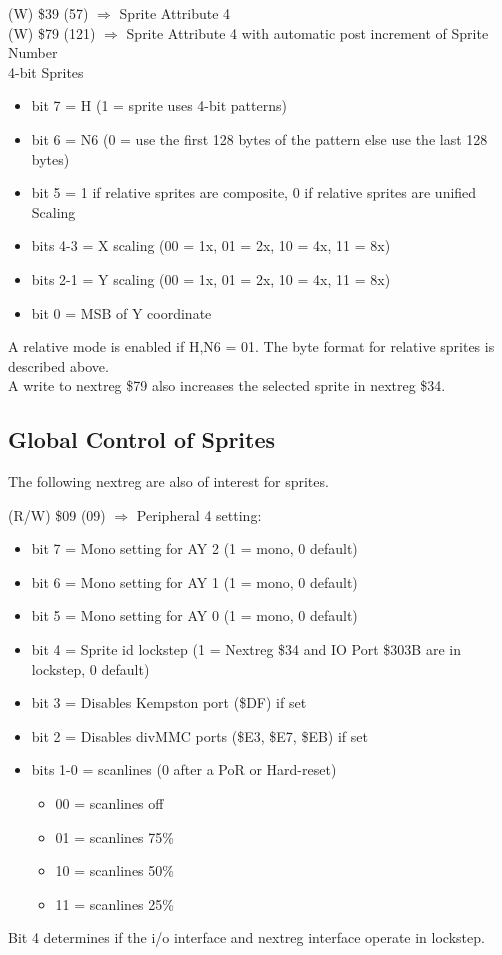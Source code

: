 (W) \$39 (57) $\Rightarrow$ Sprite Attribute 4\\
(W) \$79 (121) $\Rightarrow$ Sprite Attribute 4 with automatic post
increment of Sprite Number\\
4-bit Sprites
\begin{itemize}
\item[] bit 7 = H (1 = sprite uses 4-bit patterns)
\item[] bit 6 = N6 (0 = use the first 128 bytes of the pattern else
  use the last 128 bytes)
\item[] bit 5 = 1 if relative sprites are composite, 0 if relative
  sprites are unified Scaling
\item[] bits 4-3 = X scaling (00 = 1x, 01 = 2x, 10 = 4x, 11 = 8x)
\item[] bits 2-1 = Y scaling (00 = 1x, 01 = 2x, 10 = 4x, 11 = 8x)
\item[] bit 0 = MSB of Y coordinate
\end{itemize}
A relative mode is enabled if H,N6 = 01. The byte format for relative
sprites is described above.\\
A write to nextreg \$79 also increases the selected sprite in nextreg
\$34.

\subsection{Global Control of Sprites}

The following nextreg are also of interest for sprites.

(R/W) \$09 (09) $\Rightarrow$ Peripheral 4 setting:
\begin{itemize}
\item[] bit 7 = Mono setting for AY 2 (1 = mono, 0 default)
\item[] bit 6 = Mono setting for AY 1 (1 = mono, 0 default)
\item[] bit 5 = Mono setting for AY 0 (1 = mono, 0 default)
\item[] bit 4 = Sprite id lockstep (1 = Nextreg \$34 and IO Port
  \$303B are in lockstep, 0 default)
\item[] bit 3 = Disables Kempston port (\$DF) if set
\item[] bit 2 = Disables divMMC ports (\$E3, \$E7, \$EB) if set
\item[] bits 1-0 = scanlines (0 after a PoR or Hard-reset)
  \begin{itemize}
  \item[] 00 = scanlines off
  \item[] 01 = scanlines 75\%
  \item[] 10 = scanlines 50\%
  \item[] 11 = scanlines 25\%
  \end{itemize}
\end{itemize}
Bit 4 determines if the i/o interface and nextreg interface operate in lockstep.

